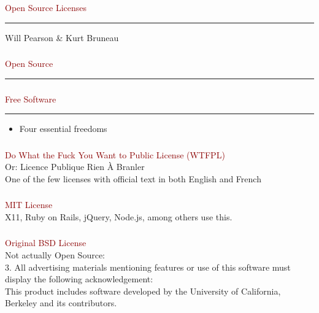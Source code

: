 \documentclass[c]{beamer}
\begin{document}
  \begin{frame}
    \frametitle{}
    \centering
    \textcolor{darkred}{{\fontsize{50pt}{1em}\selectfont Open Source Licenses}} \\
    \vspace{1em}
    \hrule
    \vspace{1em}
    Will Pearson \& Kurt Bruneau
  \end{frame}
  \begin{frame}
    \frametitle{}
    \textcolor{darkred}{{\fontsize{50pt}{1em}\selectfont Open Source}}
    \vspace{1em}
    \hrule
    \vspace{1em}
  \end{frame}
  \begin{frame}
    \frametitle{}
    \textcolor{darkred}{{\fontsize{50pt}{1em}\selectfont Free Software}} \\

    \vspace{1em}
    \hrule
    \vspace{1em}

    \begin{itemize}
      \item Four essential freedoms
    \end{itemize}

  \end{frame}
  \begin{frame}
    \frametitle{}
    \textcolor{darkred}{{\fontsize{50pt}{1em}\selectfont Do What the Fuck You Want to Public License (WTFPL) \\}}
    Or: Licence Publique Rien À Branler \\
    One of the few licenses with official text in both English and French  \\
  \end{frame}
  \begin{frame}
    \frametitle{}
    \textcolor{darkred}{{\fontsize{50pt}{1em}\selectfont MIT License \\}}
    X11, Ruby on Rails, jQuery, Node.js, among others use this. \\
  \end{frame}
  \begin{frame}
    \frametitle{}
    \textcolor{darkred}{{\fontsize{50pt}{1em}\selectfont Original BSD License \\}}
    Not actually Open Source: \\
    3. All advertising materials mentioning features or use of this software must display the following acknowledgement: \\
     This product includes software developed by the University of California, Berkeley and its contributors. \\
  \end{frame}
\end{document}
